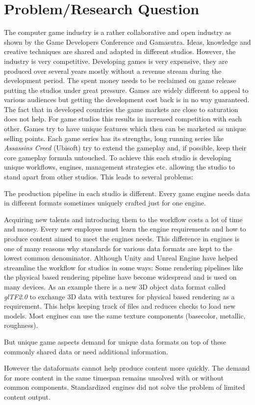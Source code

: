 \documentclass[10pt,a4paper]{article}
\begin{document}
\section{Problem/Research Question}
\begin{multicols}{2}
The computer game industry is a rather collaborative and open industry as shown by the Game Developers Conference\cite{GDC2019} and Gamasutra\cite{Gamasutra2019}. Ideas, knowledge and creative techniques are shared and adapted in different studios. However, the industry is very competitive. Developing games is very expensive, they are produced over several years mostly without a revenue stream during the development period. The spent money needs to be reclaimed on game release putting the studios under great pressure. Games are widely different to appeal to various audiences but getting the development cost back is in no way guaranteed. The fact that in developed countries the game markets are close to saturation\cite{Koster2018} does not help. For game studios this results in increased competition with each other. Games try to have unique features which then can be marketed as unique selling points. Each game series has its strengths, long running series like \textit{Assassins Creed} (Ubisoft) try to extend the gameplay and, if possible, keep their core gameplay formula untouched. To achieve this each studio is developing unique workflows, engines, management strategies etc. allowing the studio to stand apart from other studios. This leads to several problems: \begin{inlinelist} \item The production pipeline in each studio is different. Every game engine needs data in different formats sometimes uniquely crafted just for one engine. \item Acquiring new talents and introducing them to the workflow costs a lot of time and money. Every new employee must learn the engine requirements and how to produce content aimed to meet the engines needs. This difference in engines is one of many reasons why standards for various data formats are kept to the lowest common denominator. Although Unity and Unreal Engine have helped streamline the workflow for studios in some ways: Some rendering pipelines like the physical based rendering pipeline have become widespread and is used on many devices. As an example there is a new 3D object data format called \textit{glTF2.0} to exchange 3D data with textures for physical based rendering as a requirement\cite{TheKhronosGroup}. This helps keeping track of files and reduces checks to load new models. Most engines can use the same texture components (basecolor, metallic, roughness). \item But unique game aspects demand for unique data formats on top of these commonly shared data or need additional information. \item However the dataformats cannot help produce content more quickly. The demand for more content in the same timespan remains unsolved with or without common components. Standardized engines did not solve the problem of limited content output\cite{Koster2018}.\end{inlinelist}


\end{multicols}
\end{document}
